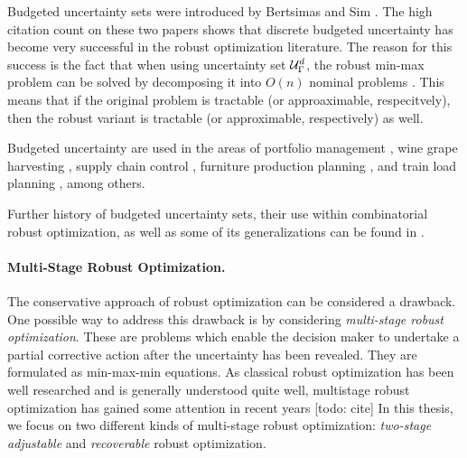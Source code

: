 Budgeted uncertainty sets were introduced by Bertsimas and Sim \cite{bertsimas2003robust,bertsimas2004price}. 
The high citation count on these two papers shows that discrete budgeted uncertainty has become very successful in the robust optimization literature. 
The reason for this success is the fact that when using uncertainty set $\mathcal{U}_\Gamma^ d$, the robust min-max problem can be solved by decomposing it into $O(n)$ nominal problems \cite{bertsimas2003robust}. This means that if the original problem is tractable (or approaximable, respecitvely), then the robust variant is tractable (or approximable, respectively) as well.

Budgeted uncertainty are used in the areas of portfolio management \cite{bertsimas2008robust}, wine grape harvesting \cite{bohle2010robust}, supply
chain control \cite{bertsimas2006robust}, furniture production planning \cite{alem2012production}, and train load planning \cite{bruns2014robust}, among others. 

Further history of budgeted uncertainty sets, their use within combinatorial robust optimization, as well as some of its generalizations can be found in \cite{poss2018robust,goerigk2023robust,goerigk2021robust}.

\paragraph*{Multi-Stage Robust Optimization.}
The conservative approach of robust optimization can be considered a drawback. One possible way to address this drawback is by considering \emph{multi-stage robust optimization}. 
These are problems which enable the decision maker to undertake a partial corrective action after the uncertainty has been revealed. They are formulated as min-max-min equations.
As classical robust optimization has been well researched and is generally understood quite well, multistage robust optimization has gained some attention in recent years [todo: cite] In this thesis, we focus on two different kinds of multi-stage robust optimization:  \emph{two-stage adjustable} and \emph{recoverable} robust optimization.

